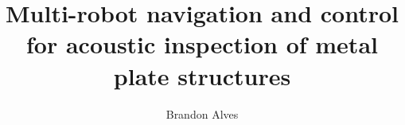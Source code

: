 \documentclass[12pt]{gatechthesis}
\title{Multi-robot navigation and control for acoustic inspection of metal plate structures}
\author{Brandon Alves}
\begin{document}
	

	\begin{frontmatter}
		
		\makeTOC
		\makeListOfTables
		\makeListOfFigures
		
		\makeListOfAcronyms
		
	\end{frontmatter}

	\begin{thesisbody}
		
		
		
		
		
		
		\makeBibliography
	\end{thesisbody}
\end{document}
